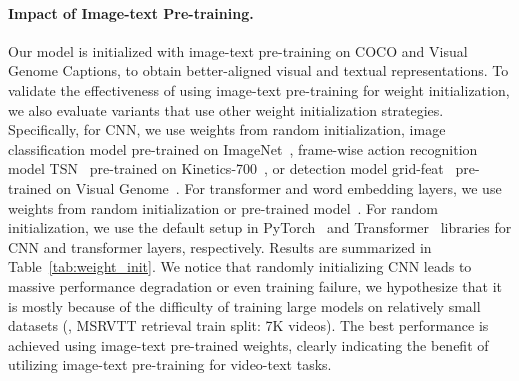 \begin{table}[!t]
\caption{
Impact of \textbf{weight initialization strategy}.
}
\label{tab:weight_init}
\vspace{-3mm}
\end{table}



\paragraph{Impact of Image-text Pre-training.} 
Our model is initialized with image-text pre-training on COCO and Visual Genome Captions, to obtain better-aligned visual and textual representations.
To validate the effectiveness of using image-text pre-training for weight initialization, we also evaluate variants that use other weight initialization strategies. 
Specifically, for CNN, we use weights from random initialization, image classification model pre-trained on ImageNet~\cite{deng2009imagenet}, frame-wise action recognition model TSN~\cite{wang2016temporal,2020mmaction2} pre-trained on Kinetics-700~\cite{smaira2020short,carreira2017quo}, or detection model grid-feat~\cite{jiang2020defense} pre-trained on Visual Genome~\cite{krishna2017visual}. 
For transformer and word embedding layers, we use weights from random initialization or pre-trained  model~\cite{devlin2018bert}.
For random initialization, we use the default setup in PyTorch~\cite{paszke2019pytorch} and Transformer~\cite{Wolf2019HuggingFacesTS} libraries for CNN and transformer layers, respectively.
Results are summarized in Table~\ref{tab:weight_init}.
We notice that randomly initializing CNN leads to massive performance degradation or even training failure, we hypothesize that it is mostly because of the difficulty of training large models on relatively small datasets (\eg, MSRVTT retrieval train split: 7K videos).
The best performance is achieved using image-text pre-trained weights, clearly indicating the benefit of utilizing image-text pre-training for video-text tasks.



